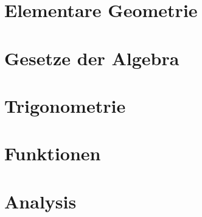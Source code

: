 \documentclass[12pt,a4paper]{article}
\begin{document}
    \tableofcontents
    
    \section{Elementare Geometrie}
    
    \section{Gesetze der Algebra}
    
    \section{Trigonometrie}
    
    \section{Funktionen}
    
    \section{Analysis}
    
    
    
\end{document}
